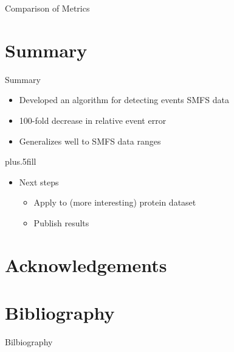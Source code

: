 \documentclass[usenames,dvipsnames]{beamer}
\begin{document}
\begin{frame}{Comparison of Metrics}
\begin{table}

\end{table}
\end{frame}

\section*{Summary}

\begin{frame}{Summary}
  \begin{itemize}
  \item
    Developed an algorithm for detecting events SMFS data
  \item
    100-fold decrease in relative event error
  \item
    Generalizes well to SMFS data ranges
  \end{itemize}
  
  \vskip0pt plus.5fill
  \begin{itemize}
  \item
    Next steps
    \begin{itemize}
    \item
      Apply to (more interesting) protein dataset
    \item
      Publish results
    \end{itemize}
  \end{itemize}
\end{frame}


\appendix

\section{Acknowledgements}

\section{Bibliography}

\begin{frame}[allowframebreaks]{Bilbiography}
  
  
\end{frame}
\end{document}
